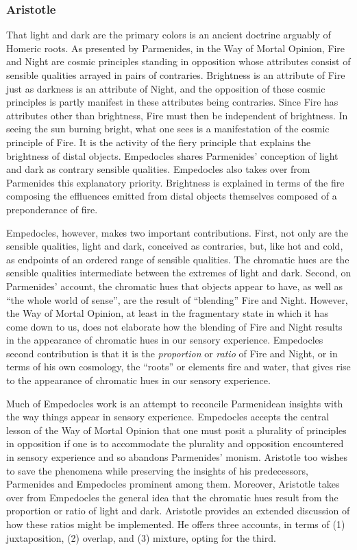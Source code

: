 \begin{frame}[t]\frametitle{Aristotle}
	
\end{frame}

That light and dark are the primary colors is an ancient doctrine arguably of Homeric roots. As presented by Parmenides, in the Way of Mortal Opinion, Fire and Night are cosmic principles standing in opposition whose attributes consist of sensible qualities arrayed in pairs of contraries. Brightness is an attribute of Fire just as darkness is an attribute of Night, and the opposition of these cosmic principles is partly manifest in these attributes being contraries. Since Fire has attributes other than brightness, Fire must then be independent of brightness. In seeing the sun burning bright, what one sees is a manifestation of the cosmic principle of Fire. It is the activity of the fiery principle that explains the brightness of distal objects. Empedocles shares Parmenides' conception of light and dark as contrary sensible qualities. Empedocles also takes over from Parmenides this explanatory priority. Brightness is explained in terms of the fire composing the effluences emitted from distal objects themselves composed of a preponderance of fire.

Empedocles, however, makes two important contributions. First, not only are the sensible qualities, light and dark, conceived as contraries, but, like hot and cold, as endpoints of an ordered range of sensible qualities. The chromatic hues are the sensible qualities intermediate between the extremes of light and dark. Second, on Parmenides' account, the chromatic hues that objects appear to have, as well as ``the whole world of sense'', are the result of ``blending'' Fire and Night. However, the Way of Mortal Opinion, at least in the fragmentary state in which it has come down to us, does not elaborate how the blending of Fire and Night results in the appearance of chromatic hues in our sensory experience. Empedocles second contribution is that it is the \emph{proportion} or \emph{ratio} of Fire and Night, or in terms of his own cosmology, the ``roots'' or elements fire and water, that gives rise to the appearance of chromatic hues in our sensory experience. 

Much of Empedocles work is an attempt to reconcile Parmenidean insights with the way things appear in sensory experience. Empedocles accepts the central lesson of the Way of Mortal Opinion that one must posit a plurality of principles in opposition if one is to accommodate the plurality and opposition encountered in sensory experience and so abandons Parmenides' monism. Aristotle too wishes to save the phenomena while preserving the insights of his predecessors, Parmenides and Empedocles prominent among them. Moreover, Aristotle takes over from Empedocles the general idea that the chromatic hues result from the proportion or ratio of light and dark. Aristotle provides an extended discussion of how these ratios might be implemented. He offers three accounts, in terms of (1) juxtaposition, (2) overlap, and (3) mixture, opting for the third. \change

